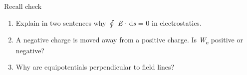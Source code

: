 \documentclass[11pt]{article}
\begin{document}
\begin{keepsection}
\begin{keepsection}
\begin{recallbox}{Recall check}
\begin{enumerate}
\item Explain in two sentences why $\oint $ \textit{E} \ensuremath{\cdot} d\textit{s} = 0 in electrostatics.
\item A negative charge is moved away from a positive charge. Is \textit{W}\textsubscript{e} positive or negative?
\item Why are equipotentials perpendicular to field lines?
\end{enumerate}

\end{recallbox}
\end{keepsection}
\end{keepsection}
\end{document}
